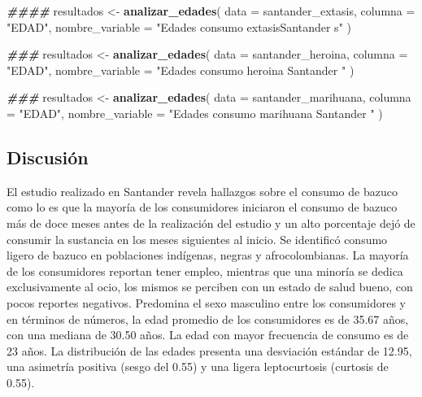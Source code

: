 \documentclass[
]{article}
\newenvironment{Shaded}{\begin{snugshade}}{\end{snugshade}}
\newcommand{\AttributeTok}[1]{\textcolor[rgb]{0.13,0.29,0.53}{#1}}
\newcommand{\DocumentationTok}[1]{\textcolor[rgb]{0.56,0.35,0.01}{\textbf{\textit{#1}}}}
\newcommand{\FunctionTok}[1]{\textcolor[rgb]{0.13,0.29,0.53}{\textbf{#1}}}
\newcommand{\NormalTok}[1]{#1}
\newcommand{\OtherTok}[1]{\textcolor[rgb]{0.56,0.35,0.01}{#1}}
\newcommand{\StringTok}[1]{\textcolor[rgb]{0.31,0.60,0.02}{#1}}
\begin{document}
\begin{Shaded}
\begin{Highlighting}[]
\DocumentationTok{\#\#\#\#}
\NormalTok{resultados }\OtherTok{\textless{}{-}} \FunctionTok{analizar\_edades}\NormalTok{(}
  \AttributeTok{data =}\NormalTok{ santander\_extasis,}
  \AttributeTok{columna =} \StringTok{"EDAD"}\NormalTok{, }
  \AttributeTok{nombre\_variable =} \StringTok{"Edades consumo extasisSantander s"}  
\NormalTok{)}

\DocumentationTok{\#\#\#}
\NormalTok{resultados }\OtherTok{\textless{}{-}} \FunctionTok{analizar\_edades}\NormalTok{(}
  \AttributeTok{data =}\NormalTok{ santander\_heroina,}
  \AttributeTok{columna =} \StringTok{"EDAD"}\NormalTok{, }
  \AttributeTok{nombre\_variable =} \StringTok{"Edades consumo heroina Santander "}  
\NormalTok{)}

\DocumentationTok{\#\#\#}
\NormalTok{resultados }\OtherTok{\textless{}{-}} \FunctionTok{analizar\_edades}\NormalTok{(}
  \AttributeTok{data =}\NormalTok{ santander\_marihuana,}
  \AttributeTok{columna =} \StringTok{"EDAD"}\NormalTok{, }
  \AttributeTok{nombre\_variable =} \StringTok{"Edades consumo marihuana Santander "}  
\NormalTok{)}
\end{Highlighting}
\end{Shaded}

\hfill\break

\subsection{Discusión}\label{discusiuxf3n}

El estudio realizado en Santander revela hallazgos sobre el consumo de
bazuco como lo es que la mayoría de los consumidores iniciaron el
consumo de bazuco más de doce meses antes de la realización del estudio
y un alto porcentaje dejó de consumir la sustancia en los meses
siguientes al inicio. Se identificó consumo ligero de bazuco en
poblaciones indígenas, negras y afrocolombianas. La mayoría de los
consumidores reportan tener empleo, mientras que una minoría se dedica
exclusivamente al ocio, los mismos se perciben con un estado de salud
bueno, con pocos reportes negativos. Predomina el sexo masculino entre
los consumidores y en términos de números, la edad promedio de los
consumidores es de 35.67 años, con una mediana de 30.50 años. La edad
con mayor frecuencia de consumo es de 23 años. La distribución de las
edades presenta una desviación estándar de 12.95, una asimetría positiva
(sesgo del 0.55) y una ligera leptocurtosis (curtosis de 0.55).\\
\end{document}
